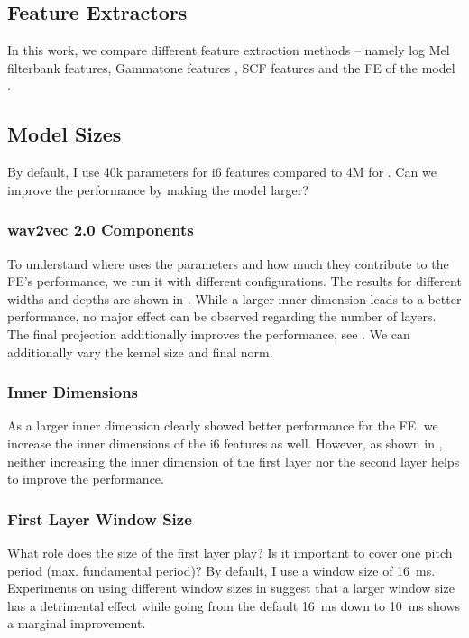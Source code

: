 \documentclass{INTERSPEECH2023}
\begin{document}
\subsection{Feature Extractors}
In this work, we compare different feature extraction methods -- namely log Mel filterbank features, Gammatone features \cite{schlueter:icassp07}, \gls{SCF} features \cite{tuske2018:waveform} and the \gls{FE} of the \wvtwo model \cite{facebook2020wav2vec2}.

\subsection{Model Sizes}
By default, I use 40k parameters for i6 features compared to 4M for \wvtwo.
Can we improve the performance by making the model larger?
\subsubsection{wav2vec 2.0 Components}
To understand where \wvtwo uses the parameters and how much they contribute to the \gls{FE}'s performance, we run it with different configurations.
The results for different widths and depths are shown in .
While a larger inner dimension leads to a better performance, no major effect can be observed regarding the number of layers.
The final projection additionally improves the performance, see .
We can additionally vary the kernel size and final norm.

\subsubsection{Inner Dimensions}
As a larger inner dimension clearly showed better performance for the \wvtwo \gls{FE}, we increase the inner dimensions of the i6 features as well.
However, as shown in , neither increasing the inner dimension of the first layer nor the second layer helps to improve the performance.

\subsubsection{First Layer Window Size}
What role does the size of the first layer play? Is it important to cover one pitch period (max. fundamental period)?
By default, I use a window size of \SI{16}{\milli\second}.
Experiments on using different window sizes in  suggest that a larger window size has a detrimental effect while going from the default \SI{16}{\milli\second} down to \SI{10}{\milli\second} shows a marginal improvement.
\end{document}
